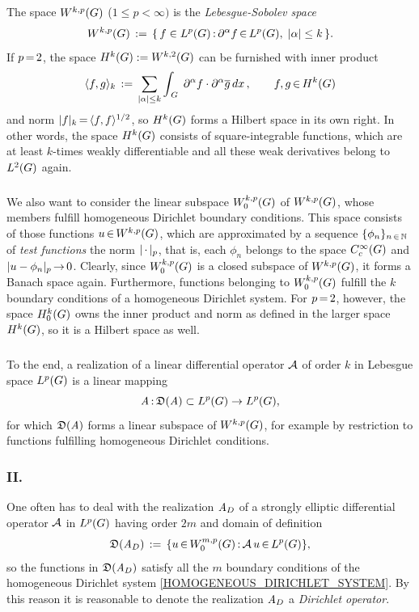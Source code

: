 \documentclass[11pt,twoside]{article}
\begin{document}
\begin{itemize}[leftmargin=4mm]
\subparagraph{} %
The space $W^{k,p}(G)$ ($1 \leq p < \infty)$
is the \textit{Lebesgue-Sobolev space}
\[
W^{k,p}(\G) \eqdef
\{\,f \in \Lp \: \PA f \xeof \Lp, \; \abs{\alpha} \leq k \, \}.
\]
If $p {\,=\,} 2$,
the space $H^k(G) := W^{k,2}(G)$ can be furnished with inner product
\[
\scalar{f}{g}_k \eqdef
\sum_{\abs{\alpha} \leq k} \int_{\,\G} \;
\PA f \cdot \PA \overline{g} \, dx\,,
\quad \quad f,g \xeof H^k(\G)
\]
and norm
$\abs{f} _k \eq \scalar{f}{f}^{1/2}$,
so $H^k(G)$ forms a Hilbert space in its own right.
In other words,
the space $H^k(G)$ consists of square-integrable functions,
which are at least $k$-times {weakly differentiable}
and all these weak derivatives belong to $L^2(G)$ again.

\subparagraph{} %
We also want to consider the linear subspace $W_0^{k,p}(G)$ of $W^{k,p}(G)$,
whose members fulfill homogeneous Dirichlet boundary conditions.
This space consists of those functions $u {\,\in\,} W^{k,p}(G)$,
which are approximated by a sequence $\{\phi_n\}_{n {\,\in\,} {\mathbb{N}}}$
of \textit{test functions} {\wrt} the norm $\abs{\,\cdot\,} _p$,
that is,
each $\phi_n$ belongs to the space $C_c^{\infty}(G)$ and $\abs{u - \phi_n} _p \xto 0$. 
Clearly,
since $W_0^{k,p}(G)$ is a closed subspace of $W^{k,p}(G)$,
it forms a Banach space again.
Furthermore,
functions belonging to $W_0^{k,p}(G)$ fulfill the $k$ boundary conditions
of a homogeneous Dirichlet system.
For $p {\,=\,} 2$,
however,
the space $H_0^{k}(G)$ owns the inner product and norm
as defined in the larger space $H^k(G)$,
so it is a Hilbert space as well.

\subparagraph{}
To the end,
a realization of a linear differential operator ${\mathcal{A}}$ of order $k$
in Lebesgue space $L^p(G)$ is a linear mapping
\[
\mathit{A} {\,:\,} \mathfrak{D}(\mathit{A}) \subset L^p(G) \to L^p(G),
\]
for which $\mathfrak{D}(\mathit{A})$ forms a linear subspace of $W^{k,p}(G)$,
for example by restriction to functions
fulfilling homogeneous Dirichlet conditions.
\end{itemize}

\subsubsection{II. \TITLEB}
One often has to deal with the realization $\mathit{A}_D$
of a strongly elliptic differential operator ${\mathcal{A}}$ in $L^p(G)$
having order $2m$ and domain of definition
\[
\mathfrak{D}(\mathit{A}_D) \,:=\, \{ u {\,\in\,} W_0^{m,p}(G) {\,:\,} {\mathcal{A}}\,u {\,\in\,} L^p(G) \},
\]
so the functions in $\mathfrak{D}(\mathit{A}_D)$ satisfy all the $m$ boundary conditions
of the homogeneous Dirichlet system \eqref{HOMOGENEOUS_DIRICHLET_SYSTEM}.
By this reason it is reasonable to denote the realization $\mathit{A}_D$
a \textit{Dirichlet operator}.
\end{document}
